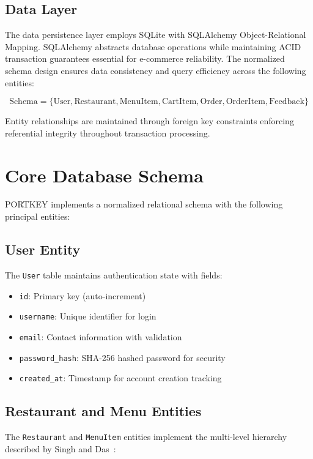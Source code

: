 \documentclass{ieeeaccess}
\begin{document}
\subsection{Data Layer}
The data persistence layer employs SQLite with SQLAlchemy Object-Relational Mapping. SQLAlchemy abstracts database operations while maintaining ACID transaction guarantees essential for e-commerce reliability. The normalized schema design ensures data consistency and query efficiency across the following entities:

\begin{equation}
\text{Schema} = \{\text{User}, \text{Restaurant}, \text{MenuItem}, \text{CartItem}, \text{Order}, \text{OrderItem}, \text{Feedback}\}
\label{eq:schema}
\end{equation}

Entity relationships are maintained through foreign key constraints enforcing referential integrity throughout transaction processing.

\section{Core Database Schema}
\label{sec:schema}

PORTKEY implements a normalized relational schema with the following principal entities:

\subsection{User Entity}
The \texttt{User} table maintains authentication state with fields:
\begin{itemize}
\item \texttt{id}: Primary key (auto-increment)
\item \texttt{username}: Unique identifier for login
\item \texttt{email}: Contact information with validation
\item \texttt{password\_hash}: SHA-256 hashed password for security
\item \texttt{created\_at}: Timestamp for account creation tracking
\end{itemize}

\subsection{Restaurant and Menu Entities}
The \texttt{Restaurant} and \texttt{MenuItem} entities implement the multi-level hierarchy described by Singh and Das~\cite{b5}:
\end{document}
